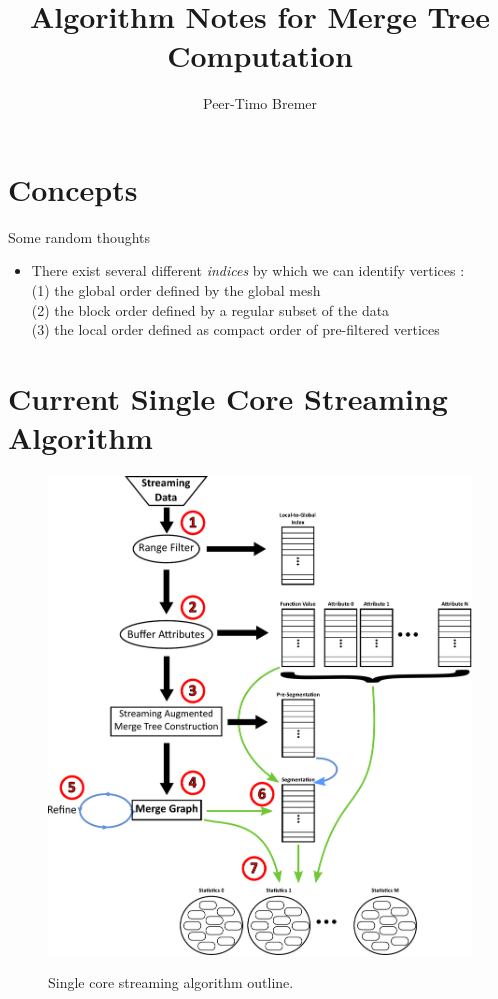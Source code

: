 \documentclass[]{article}
\title{Algorithm Notes for Merge Tree Computation}
\author{Peer-Timo Bremer}
\date{}
\begin{document}
\maketitle

\section{Concepts}

Some random thoughts

\begin{itemize}
\item There exist several different {\it indices} by which we can identify vertices :\\
  (1) the global order defined by the global mesh\\
  (2) the block order defined by a regular subset of the data\\
  (3) the local order defined as compact order of pre-filtered vertices
\end{itemize}

\section{Current Single Core Streaming Algorithm}
\begin{figure}[htbp]
\includegraphics[width=\linewidth]{MergeTree_Outline}\label{fig:ridge-valley}
\caption{Single core streaming algorithm outline.}
\end{figure}
\end{document}
